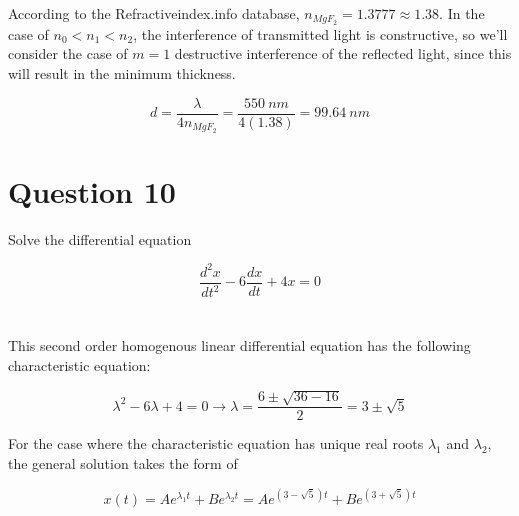 \documentclass[a4paper]{article}
\begin{document}
According to the Refractiveindex.info database, $n_{MgF_2} = 1.3777 \approx 1.38$. In the case of $n_0 < n_1 < n_2$, the interference of transmitted light is constructive, so we'll consider the case of $m = 1$ destructive interference of the reflected light, since this will result in the minimum thickness.

\[
    d = \frac{\lambda}{4 n_{MgF_2}} = \frac{\qty{550}{nm}}{4 (1.38)} = \qty{99.64}{nm}
\]




\section*{Question 10}
Solve the differential equation

\[
    {\frac{d^{2}x}{d t^{2}}}-6{\frac{d x}{d t}}+4x=0
\]\\\\

This second order homogenous linear differential equation has the following characteristic equation:

\[
    \lambda^2 - 6\lambda + 4 = 0 \rightarrow \lambda = \frac{6 \pm \sqrt{36 - 16}}{2} = 3 \pm \sqrt{5}
\]

For the case where the characteristic equation has unique real roots $\lambda_1$ and $\lambda_2$, the general solution takes the form of

\[
    x(t) = Ae^{\lambda_1 t} + Be^{\lambda_2 t} = Ae^{(3 - \sqrt{5})t} + Be^{(3 + \sqrt{5})t}
\]
\end{document}
